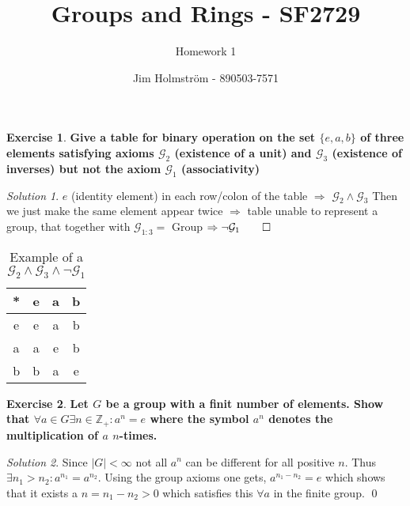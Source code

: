 \documentclass[a4paper,twoside=false,abstract=false,numbers=noenddot,
titlepage=false,headings=small,parskip=half,version=last]{scrartcl}
\author{Jim Holmström - 890503-7571}
\title{Groups and Rings - SF2729}
\subtitle{Homework 1}
\theoremstyle{definition}
\newtheorem{exercise}{Exercise}
\theoremstyle{remark}
\newtheorem*{solution}{Solution}
\newcommand{\ZZ}{\ensuremath{\mathbb{Z}}}
\newcommand{\GG}{\ensuremath{\mathcal{G}}}
\begin{document}
\maketitle
\thispagestyle{empty}

\begin{exercise}
{\bf
Give a table for binary operation on the set $\{e,a,b\}$ of
three elements satisfying axioms $\GG_2$ (existence of a unit) 
and $\GG_3$ (existence of inverses) 
but not the axiom $\GG_1$ (associativity)
}
\end{exercise}
\begin{solution}
$e$ (identity element) in each row/colon 
of the table $\Rightarrow$ $\GG_2 \wedge \GG_3$
Then we just make the same element 
appear twice $\Rightarrow$ table unable to represent a group, 
that together with $\GG_{1:3}=$ Group $\Rightarrow  \lnot \GG_1 \qed$


\begin{center}
\begin{table}[ht!]
    \centering
    \begin{tabular}{ c|*{3}{c}}
        * & e & a & b \\ \hline
        e & e & a & b \\ 
        a & a & e & b \\ 
        b & b & a & e \\ 
    \end{tabular}
    \caption{Example of a $\GG_2 \wedge \GG_3 \wedge \lnot \GG_1$}
    \label{table:nongroup_example}
\end{table}
\end{center}

\end{solution}


\begin{exercise}
{\bf
Let $G$ be a group with a finit number of elements.
Show that $\forall a \in G \exists n \in \ZZ_+ : a^n=e$ 
where the symbol $a^n$ denotes the multiplication of $a$ $n$-times.
}
\end{exercise}
\begin{solution}
Since $|G|<\infty$ not all $a^n$ can be different for all positive $n$. Thus $\exists n_1 > n_2 : a^{n_1}=a^{n_2}$.
Using the group axioms one gets, $a^{n_1-n_2}=e$ which shows that it exists a $n=n_1-n_2>0$ which satisfies this $\forall a$ in the finite group. \qed
\end{solution}

\end{document}
